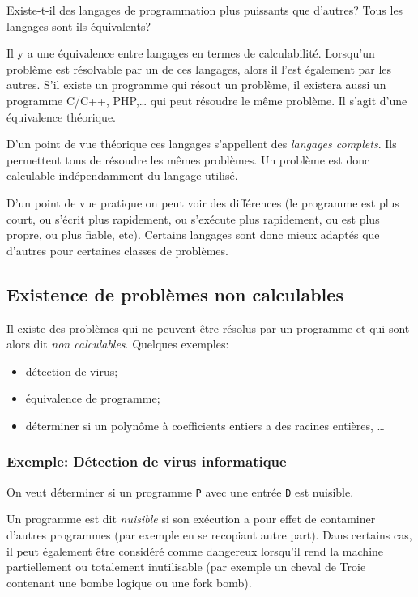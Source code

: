 Existe-t-il des langages de programmation plus puissants que d'autres? Tous les langages sont-ils équivalents?

Il y a une équivalence entre langages en termes de calculabilité.  Lorsqu'un problème est résolvable par un de ces langages, alors il l'est également par les autres.
S'il existe un programme \java qui résout un problème, il existera aussi un programme C/C++, PHP,\ldots{} qui peut résoudre le même problème. Il s'agit d'une équivalence théorique.

D'un point de vue théorique ces langages s'appellent des \emph{langages complets}. Ils permettent tous de résoudre les mêmes problèmes. Un problème est donc calculable indépendamment du langage utilisé.

D'un point de vue pratique on peut voir des différences (le programme est plus court, ou s'écrit plus rapidement, ou s'exécute plus rapidement, ou est plus propre, ou plus fiable, etc). Certains langages sont donc mieux adaptés que d'autres pour certaines classes de problèmes.


\subsection{Existence de problèmes non calculables}
\label{subsec:existence_de_problemes_non_calculables}
Il existe des problèmes qui ne peuvent être résolus par un programme et qui sont alors dit \emph{non calculables}.
Quelques exemples:
\begin{itemize}
	\item détection de virus;
	\item équivalence de programme;
	\item déterminer si un polynôme à coefficients entiers a des racines entières, \ldots
\end{itemize}

\subsubsection{Exemple: Détection de virus informatique}
\label{subsubsec:detection_de_virus_informatique}
On veut déterminer si un programme \lstinline|P| avec une entrée \lstinline|D| est nuisible.

\begin{mydef}
	Un programme est dit \emph{nuisible} si son exécution a pour effet de contaminer d'autres programmes (par exemple en se recopiant autre part). Dans certains cas, il peut également être considéré comme dangereux lorsqu'il rend la machine partiellement ou totalement inutilisable (par exemple un cheval de Troie contenant une bombe logique ou une fork bomb).
\end{mydef}


